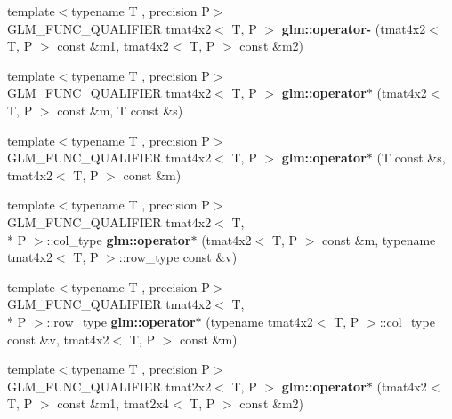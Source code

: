 \begin{DoxyCompactItemize}
\item 
\hypertarget{namespaceglm_a067e8e20b493b92468065177c1439cad}{{\footnotesize template$<$typename T , precision P$>$ }\\G\-L\-M\-\_\-\-F\-U\-N\-C\-\_\-\-Q\-U\-A\-L\-I\-F\-I\-E\-R tmat4x2$<$ T, P $>$ {\bfseries glm\-::operator-\/} (tmat4x2$<$ T, P $>$ const \&m1, tmat4x2$<$ T, P $>$ const \&m2)}\label{namespaceglm_a067e8e20b493b92468065177c1439cad}

\item 
\hypertarget{namespaceglm_a31ed3a224addbf020096fbc2f77183ae}{{\footnotesize template$<$typename T , precision P$>$ }\\G\-L\-M\-\_\-\-F\-U\-N\-C\-\_\-\-Q\-U\-A\-L\-I\-F\-I\-E\-R tmat4x2$<$ T, P $>$ {\bfseries glm\-::operator$\ast$} (tmat4x2$<$ T, P $>$ const \&m, T const \&s)}\label{namespaceglm_a31ed3a224addbf020096fbc2f77183ae}

\item 
\hypertarget{namespaceglm_a99d479929603d6aaab1fb64392f17e7b}{{\footnotesize template$<$typename T , precision P$>$ }\\G\-L\-M\-\_\-\-F\-U\-N\-C\-\_\-\-Q\-U\-A\-L\-I\-F\-I\-E\-R tmat4x2$<$ T, P $>$ {\bfseries glm\-::operator$\ast$} (T const \&s, tmat4x2$<$ T, P $>$ const \&m)}\label{namespaceglm_a99d479929603d6aaab1fb64392f17e7b}

\item 
\hypertarget{namespaceglm_a3c8f8da268292ca55b88850c5ade90e8}{{\footnotesize template$<$typename T , precision P$>$ }\\G\-L\-M\-\_\-\-F\-U\-N\-C\-\_\-\-Q\-U\-A\-L\-I\-F\-I\-E\-R tmat4x2$<$ T, \\*
P $>$\-::col\-\_\-type {\bfseries glm\-::operator$\ast$} (tmat4x2$<$ T, P $>$ const \&m, typename tmat4x2$<$ T, P $>$\-::row\-\_\-type const \&v)}\label{namespaceglm_a3c8f8da268292ca55b88850c5ade90e8}

\item 
\hypertarget{namespaceglm_a0137c6449a730160b2b3905ddddcd382}{{\footnotesize template$<$typename T , precision P$>$ }\\G\-L\-M\-\_\-\-F\-U\-N\-C\-\_\-\-Q\-U\-A\-L\-I\-F\-I\-E\-R tmat4x2$<$ T, \\*
P $>$\-::row\-\_\-type {\bfseries glm\-::operator$\ast$} (typename tmat4x2$<$ T, P $>$\-::col\-\_\-type const \&v, tmat4x2$<$ T, P $>$ const \&m)}\label{namespaceglm_a0137c6449a730160b2b3905ddddcd382}

\item 
\hypertarget{namespaceglm_ae6809ec794b89dfe2748f928eee93d9e}{{\footnotesize template$<$typename T , precision P$>$ }\\G\-L\-M\-\_\-\-F\-U\-N\-C\-\_\-\-Q\-U\-A\-L\-I\-F\-I\-E\-R tmat2x2$<$ T, P $>$ {\bfseries glm\-::operator$\ast$} (tmat4x2$<$ T, P $>$ const \&m1, tmat2x4$<$ T, P $>$ const \&m2)}\label{namespaceglm_ae6809ec794b89dfe2748f928eee93d9e}


\end{DoxyCompactItemize}
